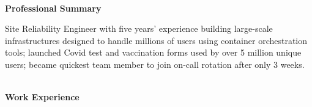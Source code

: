 \documentclass[9pt]{extarticle}
\begin{document}
{
    \begin{LARGE}
        \color{em-light}\textbf{\\[-15pt]{\firamedium Professional Summary}\\[-18pt]}
    \end{LARGE}

    \color{darkgrey}Site Reliability Engineer with five years' experience building large-scale infrastructures designed to handle millions of users using container orchestration tools; launched Covid test and vaccination forms used by over 5 million unique users; became quickest team member to join on-call rotation after only 3 weeks. 

    {\color{lightgrey}{\centerline{\rule{17cm}{0.4pt}}}}

    \begin{LARGE}
        \color{em-light}\textbf{\\[-18pt]{\firamedium Work Experience}\\[-15pt]}
    \end{LARGE}
    
}
\end{document}
